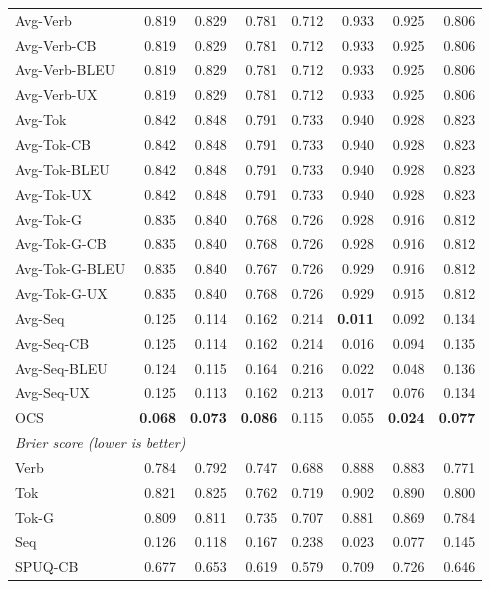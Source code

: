 {\begin{longtable}{@{}lrrrrrrr@{}}
\addlinespace
Avg-Verb & 0.819 & 0.829 & 0.781 & 0.712 & 0.933 & 0.925 & 0.806 \\
Avg-Verb-CB & 0.819 & 0.829 & 0.781 & 0.712 & 0.933 & 0.925 & 0.806 \\
Avg-Verb-BLEU & 0.819 & 0.829 & 0.781 & 0.712 & 0.933 & 0.925 & 0.806 \\
Avg-Verb-UX & 0.819 & 0.829 & 0.781 & 0.712 & 0.933 & 0.925 & 0.806 \\
\addlinespace
Avg-Tok & 0.842 & 0.848 & 0.791 & 0.733 & 0.940 & 0.928 & 0.823 \\
Avg-Tok-CB & 0.842 & 0.848 & 0.791 & 0.733 & 0.940 & 0.928 & 0.823 \\
Avg-Tok-BLEU & 0.842 & 0.848 & 0.791 & 0.733 & 0.940 & 0.928 & 0.823 \\
Avg-Tok-UX & 0.842 & 0.848 & 0.791 & 0.733 & 0.940 & 0.928 & 0.823 \\
Avg-Tok-G & 0.835 & 0.840 & 0.768 & 0.726 & 0.928 & 0.916 & 0.812 \\
Avg-Tok-G-CB & 0.835 & 0.840 & 0.768 & 0.726 & 0.928 & 0.916 & 0.812 \\
Avg-Tok-G-BLEU & 0.835 & 0.840 & 0.767 & 0.726 & 0.929 & 0.916 & 0.812 \\
Avg-Tok-G-UX & 0.835 & 0.840 & 0.768 & 0.726 & 0.929 & 0.915 & 0.812 \\
\addlinespace
Avg-Seq & 0.125 & 0.114 & 0.162 & 0.214 & \textbf{0.011} & 0.092 & 0.134 \\
Avg-Seq-CB & 0.125 & 0.114 & 0.162 & 0.214 & 0.016 & 0.094 & 0.135 \\
Avg-Seq-BLEU & 0.124 & 0.115 & 0.164 & 0.216 & 0.022 & 0.048 & 0.136 \\
Avg-Seq-UX & 0.125 & 0.113 & 0.162 & 0.213 & 0.017 & 0.076 & 0.134 \\
\addlinespace
OCS & \textbf{0.068} & \textbf{0.073} & \textbf{0.086} & 0.115 & 0.055 & \textbf{0.024} & \textbf{0.077} \\
\midrule
\multicolumn{8}{l}{\textit{Brier score (lower is better)}} \\
\midrule
Verb & 0.784 & 0.792 & 0.747 & 0.688 & 0.888 & 0.883 & 0.771 \\
\addlinespace
Tok & 0.821 & 0.825 & 0.762 & 0.719 & 0.902 & 0.890 & 0.800 \\
Tok-G & 0.809 & 0.811 & 0.735 & 0.707 & 0.881 & 0.869 & 0.784 \\
\addlinespace
Seq & 0.126 & 0.118 & 0.167 & 0.238 & 0.023 & 0.077 & 0.145 \\
\addlinespace
SPUQ-CB & 0.677 & 0.653 & 0.619 & 0.579 & 0.709 & 0.726 & 0.646 \\

\end{longtable}}
